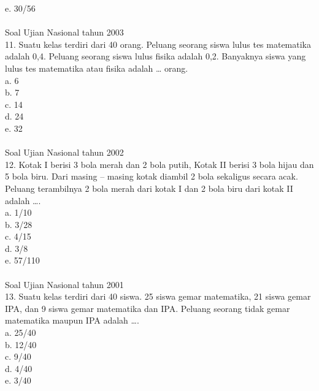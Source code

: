 \documentclass[11pt,fleqn]{book} %
\begin{document}
e. 30/56\\
\\

Soal Ujian Nasional tahun 2003\\
11. Suatu kelas terdiri dari 40 orang. Peluang seorang siswa lulus tes matematika adalah 0,4. Peluang seorang siswa lulus fisika adalah 0,2. Banyaknya siswa yang lulus tes matematika atau fisika adalah … orang.\\

a. 6\\

b. 7\\

c. 14\\

d. 24\\

e. 32\\
\\

Soal Ujian Nasional tahun 2002\\
12. Kotak I berisi 3 bola merah dan 2 bola putih, Kotak II berisi 3 bola hijau dan 5 bola biru. Dari masing – masing kotak diambil 2 bola sekaligus secara acak. Peluang terambilnya 2 bola merah dari kotak I dan 2 bola biru dari kotak II adalah ….\\

a. 1/10\\

b. 3/28\\

c. 4/15\\

d. 3/8\\

e. 57/110\\
\\

Soal Ujian Nasional tahun 2001\\
13. Suatu kelas terdiri dari 40 siswa. 25 siswa gemar matematika, 21 siswa gemar IPA, dan 9 siswa gemar matematika dan IPA. Peluang seorang tidak gemar matematika maupun IPA adalah ….\\

a. 25/40\\

b. 12/40\\

c. 9/40\\

d. 4/40\\

e. 3/40\\
\\
\end{document}
